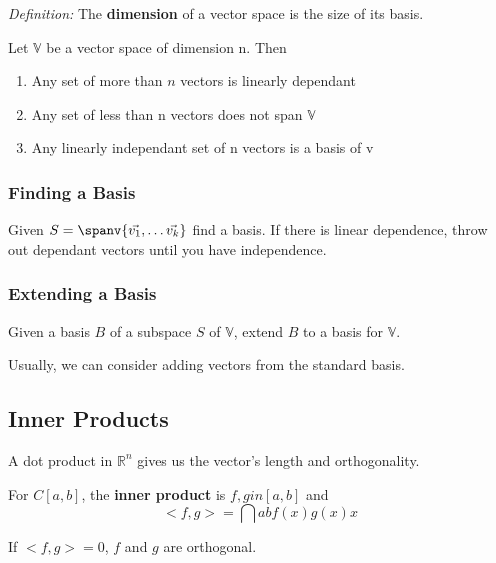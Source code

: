 \documentclass[12pt]{article}
\newcommand{\R}[1]{\mathbb{R}^{#1}}
\begin{document}

\textit{Definition:} The {\bf dimension} of a vector space is the size of its basis.

Let $\mathbb{V}$ be a vector space of dimension n. Then
\begin{enumerate}
\item Any set of more than $n$ vectors is linearly dependant
\item Any set of less than n vectors does not span $\mathbb{V}$
\item Any linearly independant set of n vectors is a basis of v
\end{enumerate}

\subsubsection*{Finding a Basis}
Given $S = \spanv{\vec{v_1},\dots \vec{v_k}}$ find a basis. If there is linear dependence, throw out dependant vectors until you have independence.


\subsubsection*{Extending a Basis}
Given a basis $B$ of a subspace $S$ of $\mathbb{V}$, extend $B$ to a basis for $\mathbb{V}$.


Usually, we can consider adding vectors from the standard basis.

\subsection*{Inner Products}
A dot product in $\R{n}$ gives us the vector's length and orthogonality.

For $C[a,b]$, the {\bf inner product} is $f, g in [a,b]$ and \[ <f,g> = \dint{a}{b}{f(x)g(x)}{x} \]

If $<f,g> = 0$, $f$ and $g$ are orthogonal.
\end{document}
